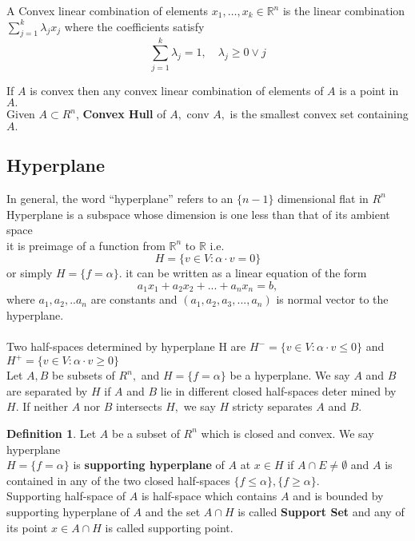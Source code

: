 \documentclass[oneside]{book}
\theoremstyle{definition}
\newtheorem{mydef}{Definition}[chapter]
\begin{document}
 A Convex linear combination of elements $x_{1}, \ldots, x_{k} \in \mathbb{R}^{n}$ is the
linear combination
$
\sum_{j=1}^{k} \lambda_{j} x_{j}
$
where the coefficients satisfy
$$
\sum_{j=1}^{k} \lambda_{j}=1, \quad \lambda_{j} \geq 0 \vee j
$$


If $A$ is convex then any convex linear combination of elements
of $A$ is a point in $A .$\\

 
 
 Given $A \subset R^{n}$, \textbf{Convex Hull} of $A,$ conv $A,$ is the smallest
convex set containing $A .$


 \subsection{Hyperplane} 
 \label{ss:4}
 In general, the word “hyperplane” refers to an $\{n-1\}$ dimensional flat in $R^{n}$ \\
 Hyperplane is a subspace whose dimension is one less than that of its ambient space  
 \\ it is preimage of a function from $\mathbb{R}^{n}$ to $\mathbb{R}$ i.e.
 \begin{equation}
 \label{eq16}  
   H=\{v \in V: \alpha \cdot v=0\} 
  \end{equation}  
    or simply  $H = \{f = \alpha \}$. 
   it can be written	as  a linear equation of the form
$$a_1x_1 + a_2x_2 + ... + a_nx_n = b,$$ where $a_1,a_2,..a_n$ are constants and $(a_1,a_2,a_3,...,a_n)$ is normal vector to the hyperplane.
\\\\
 Two half-spaces  determined by hyperplane H are 
$H^{-}=\{v \in V: \alpha \cdot v \leq 0\}$ and  $ H^{+}=\{v \in V: \alpha \cdot v \geq 0\} $ 
\\
Let $A, B$ be subsets of $R^{n},$ and $H=\{f=\alpha\}$ be a hyperplane. We say $A$ and
$B$ are separated by $H$ if $A$ and $B$ lie in different closed half-spaces deter
mined by $H .$ If neither $A$ nor $B$ intersects $H,$ we say $H$ stricty separates $A$
and $B .$\\

\begin{mydef}
Let $A$ be a subset of $R^{n}$ which is closed and convex. We say hyperplane \\ $H=\{f=\alpha\}$ is \textbf{supporting hyperplane} of $A$ at  $x \in H$  if $A \cap E \neq \emptyset$ and $A$ is contained in any of the two closed half-spaces $\{f \leq \alpha\}, \{f \geq \alpha\}$.
\\
    Supporting half-space of $A$ is half-space which contains $A$ and is bounded by supporting hyperplane of $A$  and the set $A \cap H$ is called \textbf{Support Set} and any of its point $x \in A \cap H$ is called supporting point.
\end{mydef}
\end{document}
